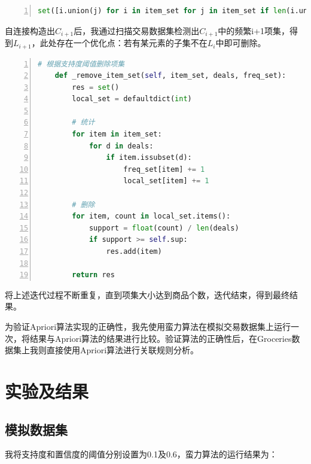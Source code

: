 \documentclass[12pt,a4paper]{article}
\theoremstyle{definition}
\begin{document}
\vspace{0.02\linewidth}
\begin{lstlisting}[language=Python,
	numbers=left,
	keywordstyle=\color{blue!70},
	frame=shadowbox,
	breaklines=True]
set([i.union(j) for i in item_set for j in item_set if len(i.union(j)) == id])
\end{lstlisting}

\vspace{0.02\linewidth}
自连接构造出$C_{i+1}$后，我通过扫描交易数据集检测出$C_{i+1}$中的频繁i+1项集，得到$L_{i+1}$，此处存在一个优化点：若有某元素的子集不在$L_i$中即可删除。

\vspace{0.02\linewidth}
\begin{lstlisting}[language=Python,
	numbers=left,
	keywordstyle=\color{blue!70},
	frame=shadowbox,
	breaklines=True]
# 根据支持度阈值删除项集
    def _remove_item_set(self, item_set, deals, freq_set):
        res = set()
        local_set = defaultdict(int)

        # 统计
        for item in item_set:
            for d in deals:
                if item.issubset(d):
                    freq_set[item] += 1
                    local_set[item] += 1

        # 删除
        for item, count in local_set.items():
            support = float(count) / len(deals)
            if support >= self.sup:
                res.add(item)

        return res
\end{lstlisting}

\vspace{0.01\linewidth}
将上述迭代过程不断重复，直到项集大小达到商品个数，迭代结束，得到最终结果。

\vspace{0.01\linewidth}
为验证Apriori算法实现的正确性，我先使用蛮力算法在模拟交易数据集上运行一次，将结果与Apriori算法的结果进行比较。验证算法的正确性后，在Groceries数据集上我则直接使用Apriori算法进行关联规则分析。


\section{实验及结果}

\subsection{模拟数据集}

我将支持度和置信度的阈值分别设置为0.1及0.6，蛮力算法的运行结果为：
\end{document}
